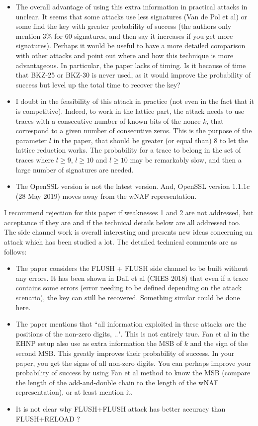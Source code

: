 \begin{itemize}
  \item The overall advantage of using this extra information in practical attacks in unclear. It seems that some attacks use less signatures (Van de Pol et al) or some
find the key with greater probability of success (the authors only mention $3\%$ for $60$ signatures, and then say it increases if you get more signatures).
Perhaps it would be useful to have a more detailed comparison with other attacks and point out where and how this technique is more advantageous. 
In particular, the paper lacks of timing. Is it because of time that BKZ-25 or BKZ-30 is never used, as it would improve the probability of success but level
up the total time to recover the key?
  \item I doubt in the feasibility of this attack in practice (not even in the fact that it is competitive).
Indeed, to work in the lattice part, the attack needs to use traces with a consecutive number of known bits of the nonce $k$, that correspond to a given
number of consecutive zeros. This is the purpose of the parameter $l$ in the paper, that should be greater (or equal than) $8$ to let the lattice reduction
works. The probability for a trace to belong in the set of traces where $l\geq 9$, $l\geq 10$ and $l\geq 10$ may be remarkably slow, and then a large number of signatures are needed.
  \item The OpenSSL version is not the latest version. And, OpenSSL version 1.1.1c (28 May 2019) moves away from the wNAF representation. 
\end{itemize}

I recommend rejection for this paper if weaknesses 1 and 2 are not addressed, but acceptance if they are and if the technical details below are all addressed too. 
The side channel work is overall interesting and presents new ideas concerning an attack which has been studied a lot.
The detailed technical comments are as follows:
\begin{itemize}
  \item The paper considers the FLUSH + FLUSH side channel to be built without any errors. It has been shown in Dall et al (CHES 2018) that even if a trace contains some errors (error needing to be defined depending on the attack scenario), the key can still be recovered. Something similar could be done here.
  \item The paper mentions that ``all information exploited in these attacks are the positions of the non-zero digits, ..".  This is not entirely true. Fan et al in the EHNP setup also use as extra information the MSB of $k$ and the sign of the second MSB. This greatly improves their probability of success. In your paper, you get the signs of all non-zero digits. You can perhaps improve your probability of success by using Fan et al method to know the MSB (compare the length of the add-and-double chain to the length of the wNAF representation), or at least mention it.
  \item It is not clear why FLUSH+FLUSH attack has better accuracy than FLUSH+RELOAD ?
\end{itemize}

